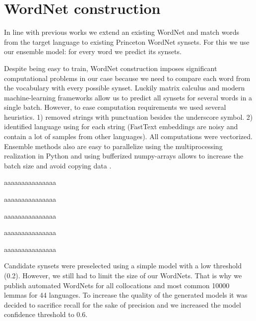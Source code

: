 \documentclass[11pt,a4paper]{article}
\begin{document}
\section{WordNet construction}
In line with previous works \cite{Vossen1998,tufis2006romanian} we extend an existing WordNet and match words from the target language to existing Princeton WordNet synsets. For this we use our ensemble model: for every word we predict its synsets.

Despite being easy to train, WordNet construction imposes significant computational problems in our case because we need to compare each word from the vocabulary with every possible synset. Luckily matrix calculus and modern machine-learning frameworks allow us to predict all synsets for several words in a single batch. However, to ease computation requirements we used several heuristics. 1) removed strings with punctuation besides the underscore symbol. 2) identified language using \cite{Joulin2016} for each string (FastText embeddings are noisy and contain a lot of samples from other languages).  All computations were vectorized. Ensemble methods also are easy to parallelize using the multiprocessing realization in Python and using bufferized numpy-arrays allows to increase the batch size and avoid copying data \cite{gorelick2014high}.

aaaaaaaaaaaaaaa

aaaaaaaaaaaaaaa

aaaaaaaaaaaaaaa

aaaaaaaaaaaaaaa

aaaaaaaaaaaaaaa

Candidate synsets were preselected using a simple model with a low threshold (0.2). However, we still had to limit the size of our WordNets. That is why we publish automated WordNets for all collocations and most common 10000 lemmas for 44 languages. To increase the quality of the generated models it was decided to sacrifice recall for the sake of precision and we increased the model confidence threshold to 0.6.
\end{document}
